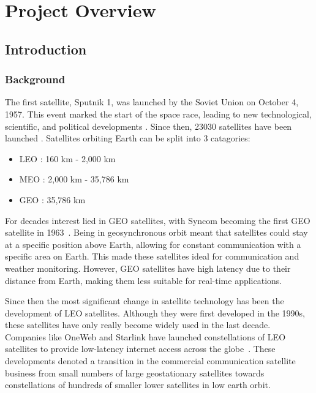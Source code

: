 \chapter{Project Overview}

\section{Introduction}

\subsection{Background}

The first satellite, Sputnik 1, was launched by the Soviet Union on October 4, 1957. This event marked the start of the space race, leading to new technological, scientific, and political developments \cite{nasa-sputnik}. Since then, 23030 satellites have been launched \cite{esa-debris}. Satellites orbiting Earth can be split into 3 catagories:

\begin{itemize}
    \item \ac{LEO} : 160 km - 2,000 km

    \item \ac{MEO} : 2,000 km - 35,786 km

    \item \ac{GEO} : 35,786 km
\end{itemize}

For decades interest lied in \ac{GEO} satellites, with Syncom becoming the first \ac{GEO} satellite in 1963~\cite{nasa-syncom}. Being in geosynchronous orbit meant that satellites could stay at a specific position above Earth, allowing for constant communication with a specific area on Earth. This made these satellites ideal for communication and weather monitoring. However, \ac{GEO} satellites have high latency due to their distance from Earth, making them less suitable for real-time applications.

Since then the most significant change in satellite technology has been the development of \ac{LEO} satellites. Although they were first developed in the 1990s, these satellites have only really become widely used in the last decade. Companies like OneWeb and Starlink have launched constellations of \ac{LEO} satellites to provide low-latency internet access across the globe~\cite{reliasat-evolution}. These developments denoted a transition in the commercial communication satellite business from small numbers of large geostationary satellites towards constellations of hundreds of smaller lower satellites in low earth orbit.

